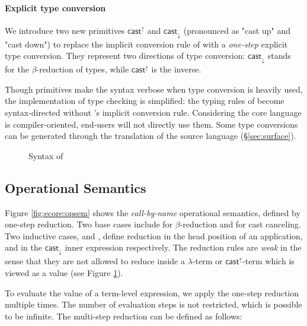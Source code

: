 \paragraph{Explicit type conversion}

We introduce two new primitives $ \mathsf{cast}^{\uparrow} $ and $ \mathsf{cast}_{\downarrow} $
(pronounced as "cast up" and "cast down") to replace the implicit
conversion rule of \cc with a \emph{one-step} explicit type
conversion. They represent two directions of type conversion:
$ \mathsf{cast}_{\downarrow} $ stands for the $\beta$-reduction of types, while
$ \mathsf{cast}^{\uparrow} $ is the inverse. %

Though \cast primitives make the syntax verbose when type conversion
is heavily used, the implementation of type checking is simplified:
the typing rules of \ecore become syntax-directed without \cc's
implicit conversion rule. 
Considering the core language is
compiler-oriented, end-users will not directly use them. 
Some type
conversions can be generated through the translation of the source
language (\S \ref{sec:surface}).

\begin{figure}
    \gram{\ottec\ottinterrule
        \ottG\ottinterrule
        \ottv}
    \caption{Syntax of \ecore}
    \label{fig:ecore:syntax}
\end{figure}

\subsection{Operational Semantics}\label{sec:ecore:opsem}

Figure \ref{fig:ecore:opsem} shows the \emph{call-by-name} operational
semantics, defined by one-step reduction. Two base cases include
 for $\beta$-reduction and 
for cast canceling. Two inductive cases,  and
, define reduction in the head position of an
application, and in the $ \mathsf{cast}_{\downarrow} $ inner expression
respectively. The reduction rules are \emph{weak} in the sense that they
are not allowed to reduce inside a $\lambda$-term or $ \mathsf{cast}^{\uparrow} $-term
which is viewed as a value (see Figure \ref{fig:ecore:syntax}).

To evaluate the value of a term-level expression, we apply the
one-step reduction multiple times. The number of evaluation steps is
not restricted, which is possible to be infinite. The multi-step
reduction can be defined as follows:

